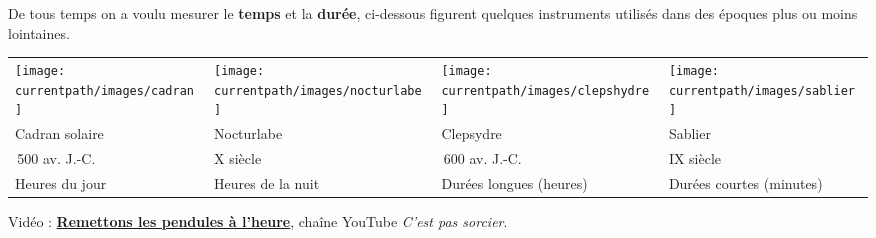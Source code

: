 \vspace*{-7mm}


\begin{debat}
    De tous temps on a voulu mesurer le {\bf temps} et la {\bf durée}, ci-dessous figurent 
    quelques instruments utilisés dans des époques plus ou moins lointaines. \\
    \textcolor{B1}{\small
    \begin{tabular}{*{4}{>{\centering\arraybackslash}p{3.5cm}}}
       \texttt{[image: \\currentpath/images/cadran]}
       &
       \texttt{[image: \\currentpath/images/nocturlabe]}
       &
       \texttt{[image: \\currentpath/images/clepshydre]}
       &
       \texttt{[image: \\currentpath/images/sablier]} \\
       Cadran solaire & Nocturlabe & Clepsydre & Sablier \\
       1\,500 av. J.-C. & X\up{e} siècle & 1\,600 av. J.-C. & IX\up{e} siècle \\
       Heures du jour & Heures de la nuit & Durées longues (heures) & Durées courtes (minutes) \\
    \end{tabular}}
    \bigskip
    \begin{cadre}[B2][F4]
       \begin{center}
          Vidéo : \href{https://www.yout-ube.com/watch?v=8vMTE9U9z0U}{\bf Remettons les pendules à l'heure}, chaîne YouTube {\it C'est pas sorcier}.
       \end{center}
    \end{cadre}
 \end{debat}